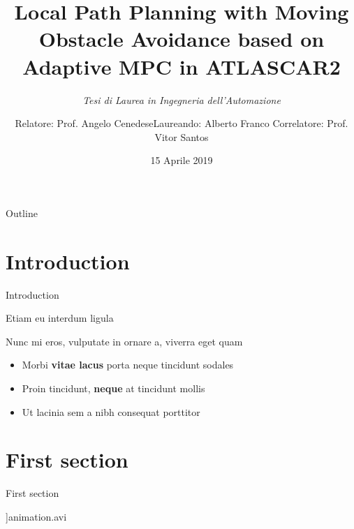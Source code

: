 \documentclass{beamer}
\title{Local Path Planning with Moving Obstacle Avoidance based on Adaptive MPC in ATLASCAR2}
\subtitle{\itshape Tesi di Laurea in Ingegneria dell'Automazione}
\author{Relatore: Prof. Angelo Cenedese\qquad\quad Laureando: Alberto Franco Correlatore: Prof. Vitor Santos}
\date{\vspace{0.4cm}15 Aprile 2019}
\begin{document}
	\maketitle

	\begin{frame}{Outline}
		\tableofcontents
	\end{frame}


	\section{Introduction}

	\begin{frame}{Introduction}
		
		Etiam eu interdum ligula

		Nunc mi eros, vulputate in ornare a, viverra eget quam \vspace{.5em}

		\begin{itemize}
			\item Morbi \textbf{vitae lacus} porta neque tincidunt sodales \vspace{.5em}
			\item Proin tincidunt, \textbf{neque} at tincidunt mollis \vspace{.5em}
			\item Ut \alert{lacinia sem a nibh} consequat porttitor
		\end{itemize}
	\end{frame}


	\section{First section}

	\begin{frame}{First section}
		
		\mediabutton[mediacommand=myVidPlayer:setSource [(./videos/animation_6_obstacles.avi)]]{animation.avi}
	\end{frame}
\end{document}
